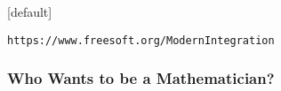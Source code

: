 \documentclass[aspectratio=169,dvipsnames]{beamer}
\begin{document}
[default]

\begin{frame}
\titlepage
\begin{block}{}
\centerline{\tt https://www.freesoft.org/ModernIntegration}
\end{block}
\end{frame}

\begin{frame}
\frametitle{Who Wants to be a Mathematician?}
\def\QuestionFont{\Huge\bf}
\def\AnswerFont{}
\def\huge{}
\def\LARGE{}
\end{frame}
\end{document}
